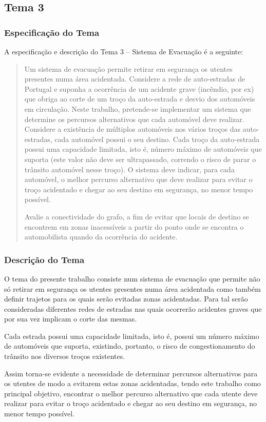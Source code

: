 \documentclass[relatorio.tex]{subfiles}
\begin{document}
\subsection{Tema 3}
\label{subsec:tema}

\subsubsection{Especificação do Tema}
\label{subsubsec:spec}

A especificação e descrição do Tema 3 -- Sistema de Evacuação
é a seguinte:

\begin{quote}
Um sistema de evacuação permite retirar em segurança os
utentes presentes numa área acidentada.
Considere a rede de auto-estradas de Portugal e suponha a
ocorrência de um acidente grave (incêndio, por ex) que obriga
ao corte de um troço da auto-estrada e desvio dos automóveis
em circulação.
Neste trabalho, pretende-se implementar um sistema que determine
os percursos alternativos que cada automóvel deve realizar.
Considere a existência de múltiplos automóveis nos vários troços
das auto-estradas, cada automóvel possui o seu destino. Cada
troço da auto-estrada possui uma capacidade limitada, isto é,
número máximo de automóveis que suporta (este valor não deve
ser ultrapassado, correndo o risco de parar o trânsito automóvel
nesse troço).  
O sistema deve indicar, para cada automóvel, o melhor percurso
alternativo que deve realizar para evitar o troço acidentado e
chegar ao seu destino em segurança, no menor tempo possível.

Avalie a conectividade do grafo, a fim de evitar que locais de destino se encontrem em zonas inacessíveis a partir do ponto onde se encontra o automobilista quando da ocorrência do acidente.
\end{quote}



\subsubsection{Descrição do Tema}

O tema do presente trabalho consiste num sistema de evacuação
que permite não só retirar em segurança os utentes presentes
numa área acidentada como também definir trajetos para os quais
serão evitadas zonas acidentadas. Para tal serão consideradas
diferentes redes de estradas nas quais ocorrerão acidentes graves
que por sua vez implicam o corte das mesmas.

Cada estrada possui uma capacidade limitada, isto é, possui um
número máximo de automóveis que suporta, existindo, portanto, o
risco de congestionamento do trânsito nos diversos troços existentes.

Assim torna-se evidente a necessidade de determinar percursos
alternativos para os utentes de modo a evitarem estas zonas
acidentadas, tendo este trabalho como principal objetivo, encontrar
o melhor percurso alternativo que cada utente deve realizar para
evitar o troço acidentado e chegar ao seu destino em segurança,
no menor tempo possível.
\end{document}
